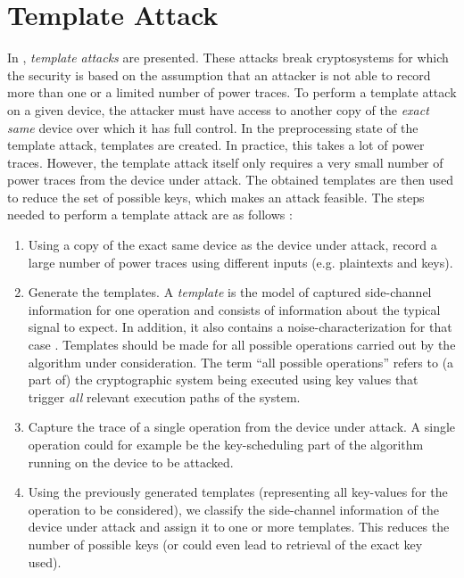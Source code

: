 \section{Template Attack} \label{sec: Template Attack}
In \cite{chari2002template}, \emph{template attacks} are presented.
These attacks break cryptosystems for which the security is based on the assumption that an attacker is not able to record more than one or a limited number of power traces.
To perform a template attack on a given device, the attacker must have access to another copy of the \emph{exact same} device over which it has full control.
In the preprocessing state of the template attack, templates are created.
In practice, this takes a lot of power traces.
However, the template attack itself only requires a very small number of power traces from the device under attack. 
The obtained templates are then used to reduce the set of possible keys, which makes an attack feasible.
The steps needed to perform a template attack are as follows \cite{whisperer2018template}:
%
\begin{enumerate}
	\item Using a copy of the exact same device as the device under attack, record a large number of power traces using different inputs (e.g. plaintexts and keys).
	
	\item Generate the templates. A \emph{template} is the model of captured side-channel information for one operation and consists of information about the typical signal to expect. 
	In addition, it also contains a noise-characterization for that case \cite{rechberger2004practical}. 
	Templates should be made for all possible operations carried out by the algorithm under consideration.
	The term ``all possible operations'' refers to (a part of) the cryptographic system being executed using key values that trigger \emph{all} relevant execution paths of the system.
	
	\item Capture the trace of a single operation from the device under attack. 
	A single operation could for example be the key-scheduling part of the algorithm running on the device to be attacked.
	
	\item Using the previously generated templates (representing all key-values for the operation to be considered), we classify the side-channel information of the device under attack and assign it to one or more templates. 
	This reduces the number of possible keys (or could even lead to retrieval of the exact key used).
\end{enumerate}
